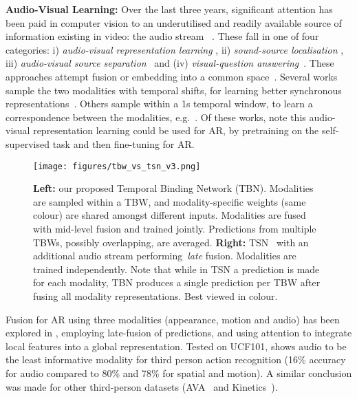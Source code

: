 \documentclass[10pt,twocolumn,letterpaper]{article}
\begin{document}
\noindent\textbf{Audio-Visual Learning:} Over the last three years, significant attention has been paid in computer vision to an underutilised and readily available
source of information existing in video: the audio stream
~\cite{ObjectSound,AytarVT16,ArandjelovicZ17,Owens0MFT16,AVEearlyFusion,AytarVT17,VoicesFaces,TextVideo,Senocak_2018_CVPR,gao2019visual-sound}. 
These fall in one of four categories: i) \textit{audio-visual representation learning} \cite{ArandjelovicZ17,AytarVT16,AytarVT17,TextVideo,AVEearlyFusion, Owens0MFT16}, 
ii) \textit{sound-source localisation} \cite{ObjectSound,AVEearlyFusion,Senocak_2018_CVPR},  
iii) \textit{audio-visual source separation}~\cite{AVEearlyFusion, gao2019visual-sound} and (iv) \textit{visual-question answering}~\cite{alamri@DSTC7}.
These approaches attempt fusion \cite{ArandjelovicZ17, AVEearlyFusion} or embedding into a common space~\cite{ObjectSound,AytarVT17,learnablePINs}. 
Several works sample the two modalities with temporal shifts, for learning better synchronous representations~\cite{AVEearlyFusion,Korbar18}. Others
sample within a 1s temporal window, to learn a correspondence between 
the modalities, e.g.\ \cite{ArandjelovicZ17,ObjectSound}.
Of these works, \cite{AVEearlyFusion,Korbar18} note this audio-visual representation learning could be used for AR, by pretraining on the self-supervised task and then fine-tuning for AR. 

 \begin{figure*}[t]
	\centering
	\texttt{[image: figures/tbw\_vs\_tsn\_v3.png]}
	\vspace*{-6pt}
	\caption{
	\textbf{Left:} our proposed Temporal Binding Network (TBN). Modalities are sampled within a TBW, and modality-specific weights (same colour) are shared amongst different inputs.
	Modalities are fused with mid-level fusion and trained jointly. Predictions from multiple TBWs, possibly overlapping, are averaged.
	\textbf{Right:} TSN~\cite{TSN2016ECCV} with an additional audio stream performing~\textit{late} fusion. Modalities are trained independently. Note that while in TSN a prediction is made for each modality, TBN produces a single prediction per TBW after fusing all modality representations. Best viewed in colour.}
	\label{fig:tsn}
\end{figure*}

Fusion for AR using three modalities (appearance, motion and audio) has been explored in \cite{WuMM2016}, employing late-fusion of predictions, and \cite{Long_2018_CVPR, AAAI1817054} using attention
to integrate local features into a global representation.
Tested on UCF101, \cite{WuMM2016} shows audio to be the least informative modality for third person action recognition (16\% accuracy for audio compared to 80\% and 78\% for spatial and motion). 
A similar conclusion was made for other third-person datasets (AVA~\cite{Girdhar2018} and Kinetics~\cite{Long_2018_CVPR,AAAI1817054}). 
\end{document}
